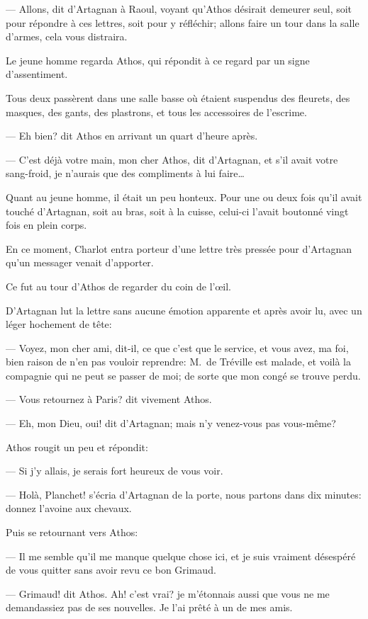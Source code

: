 — Allons, dit d'Artagnan à Raoul, voyant qu'Athos désirait demeurer seul, soit pour répondre à ces lettres, soit pour y réfléchir; allons faire un tour dans la salle d'armes, cela vous distraira.

Le jeune homme regarda Athos, qui répondit à ce regard par un signe d'assentiment.

Tous deux passèrent dans une salle basse où étaient suspendus des fleurets, des masques, des gants, des plastrons, et tous les accessoires de l'escrime.

— Eh bien? dit Athos en arrivant un quart d'heure après.

— C'est déjà votre main, mon cher Athos, dit d'Artagnan, et s'il avait votre sang-froid, je n'aurais que des compliments à lui faire\dots

Quant au jeune homme, il était un peu honteux. Pour une ou deux fois qu'il avait touché d'Artagnan, soit au bras, soit à la cuisse, celui-ci l'avait boutonné vingt fois en plein corps.

En ce moment, Charlot entra porteur d'une lettre très pressée pour d'Artagnan qu'un messager venait d'apporter.

Ce fut au tour d'Athos de regarder du coin de l'œil.

D'Artagnan lut la lettre sans aucune émotion apparente et après avoir lu, avec un léger hochement de tête:

— Voyez, mon cher ami, dit-il, ce que c'est que le service, et vous avez, ma foi, bien raison de n'en pas vouloir reprendre: M.~de Tréville est malade, et voilà la compagnie qui ne peut se passer de moi; de sorte que mon congé se trouve perdu.

— Vous retournez à Paris? dit vivement Athos.

— Eh, mon Dieu, oui! dit d'Artagnan; mais n'y venez-vous pas vous-même?

Athos rougit un peu et répondit:

— Si j'y allais, je serais fort heureux de vous voir.

— Holà, Planchet! s'écria d'Artagnan de la porte, nous partons dans dix minutes: donnez l'avoine aux chevaux.

Puis se retournant vers Athos:

— Il me semble qu'il me manque quelque chose ici, et je suis vraiment désespéré de vous quitter sans avoir revu ce bon Grimaud.

— Grimaud! dit Athos. Ah! c'est vrai? je m'étonnais aussi que vous ne me demandassiez pas de ses nouvelles. Je l'ai prêté à un de mes amis.

